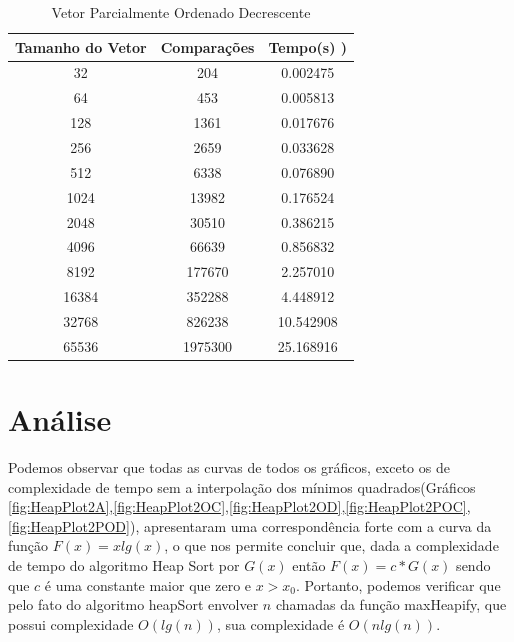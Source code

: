 \documentclass[12pt,a4paper,twoside]{report}
\begin{document}
\begin{table}[h]
  \centering
  \caption{Vetor Parcialmente Ordenado Decrescente \label{tab:pod}}
  \begin{tabular}{ccc} \\\hline
  \textbf{Tamanho do Vetor} & \textbf{Comparações} & \textbf{Tempo(s)} )} \\\hline
  32                        & 204                  & 0.002475          \\\hline
  64                        & 453                 & 0.005813          \\\hline
  128                       & 1361                 & 0.017676          \\\hline
  256                       & 2659                & 0.033628          \\\hline
  512                       & 6338               & 0.076890          \\\hline
  1024                      & 13982               & 0.176524          \\\hline
  2048                      & 30510              & 0.386215          \\\hline
  4096                      & 66639              & 0.856832         \\\hline
  8192                      & 177670             & 2.257010        \\\hline
  16384                     & 352288            & 4.448912        \\\hline
  32768                     & 826238            & 10.542908        \\\hline
  65536                     & 1975300            & 25.168916        \\\hline

  \end{tabular}
\end{table}


\chapter{Análise}

Podemos observar que todas as curvas de todos os gráficos, exceto os de complexidade de tempo sem a interpolação dos mínimos quadrados(Gráficos \ref{fig:HeapPlot2A},\ref{fig:HeapPlot2OC},\ref{fig:HeapPlot2OD},\ref{fig:HeapPlot2POC},\ref{fig:HeapPlot2POD}), apresentaram uma correspondência forte com a curva da função $F(x) = x lg(x)$, o que nos permite concluir que, dada a complexidade de tempo do algoritmo Heap Sort por $G(x)$ então $F(x) = c * G(x)$ sendo que $c$ é uma constante maior que zero e $x > x_0$. Portanto, podemos verificar que pelo fato do algoritmo heapSort envolver $n$ chamadas da função maxHeapify, que possui complexidade $O(lg(n))$, sua complexidade é $O(n lg(n))$.
\end{document}
